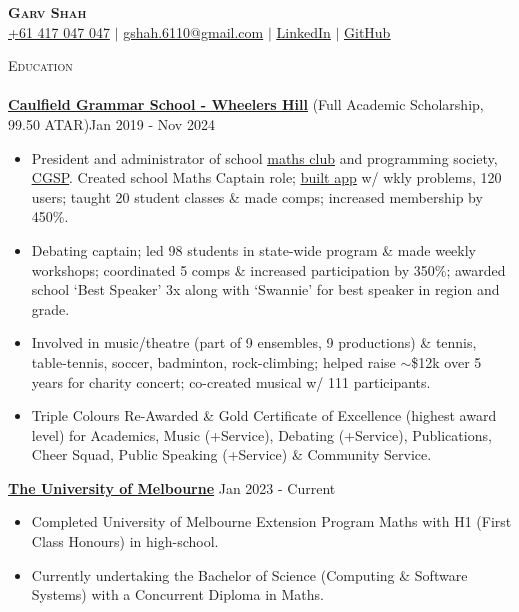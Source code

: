 \documentclass[a4paper]{article}
\newcommand{\lineunder} {
    \vspace*{-8pt} \\
    \hspace*{-10pt} \hrulefill \\
}
\newcommand{\header} [1] {
    {\hspace*{-10pt}\vspace*{6pt} \large\textsc{#1}}
    \vspace*{-6pt} \lineunder
}
\begin{document}

\begin{center}
    \textbf{\Huge \scshape Garv Shah} \\ \vspace{1pt}
    \small \href{tel:+61417047047}{+61 417 047 047} $|$ \href{mailto:gshah.6110@gmail.com}{gshah.6110@gmail.com} $|$
    \href{https://www.linkedin.com/in/garvshah/}{\ul{LinkedIn}} $|$
    \href{https://garv-shah.github.io/}{\ul{GitHub}}
\end{center}
\vspace{-2mm}

\header{Education}
\href{https://www.caulfieldgs.vic.edu.au/wheelers-hill/}{\textbf{\ul{Caulfield Grammar School - Wheelers Hill}}} (Full Academic Scholarship, 99.50 ATAR)\hfill Jan 2019 - Nov 2024\\
\vspace{-2mm}
\begin{itemize} \itemsep -1pt
    \item President and administrator of school \href{https://cgs-math.github.io/}{\ul{maths club}} and programming society, \href{https://cgs-programming.github.io}{\ul{CGSP}}.
    Created school Maths Captain role; \href{https://github.com/cgs-math/app}{\ul{built app}} w/ wkly problems, 120 users; taught 20 student classes \& made comps; increased membership by 450\%.
    \item Debating captain; led 98 students in state-wide program \& made weekly workshops; coordinated 5 comps \& increased participation by 350\%; awarded school ‘Best Speaker’ 3x along with ‘Swannie’ for best speaker in region and grade.
    \item Involved in music/theatre (part of 9 ensembles, 9 productions) \& tennis, table-tennis, soccer, badminton, rock-climbing; helped raise $\sim$\$12k over 5 years for charity concert; co-created musical w/ 111 participants.
    \item Triple Colours Re-Awarded \& Gold Certificate of Excellence (highest award level) for Academics, Music (+Service), Debating (+Service), Publications, Cheer Squad, Public Speaking (+Service) \& Community Service.
\end{itemize}
\vspace{-2mm}
\href{https://www.unimelb.edu.au/}{\textbf{\ul{The University of Melbourne}}} \hfill Jan 2023 - Current\\
\vspace{-2mm}
\begin{itemize} \itemsep -1pt
    \item Completed University of Melbourne Extension Program Maths with H1 (First Class Honours) in high-school.
    \item Currently undertaking the Bachelor of Science (Computing \& Software Systems) with a Concurrent Diploma in Maths.
\end{itemize}
\vspace{-2mm}
\end{document}
